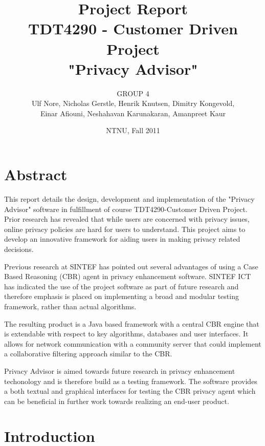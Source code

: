 \documentclass[11pt,a4paper]{book}
\title{Project Report\\
TDT4290 - Customer Driven Project \\ 
"Privacy Advisor"}
\author{GROUP 4\\
Ulf Nore, Nicholas Gerstle, Henrik Knutsen, Dimitry Kongevold,\\ 
Einar Afiouni, Neshahavan Karunakaran, Amanpreet Kaur}
\date{NTNU, Fall 2011}
\begin{document}


\dominitoc 

\frontmatter

\chapter*{\centering Abstract}
This report details the design, development and implementation of the
"Privacy Advisor" software in fulfillment of course TDT4290-Customer
Driven Project. Prior research has revealed that while users are
concerned with privacy issues, online privacy policies are hard for
users to understand. This project aims to develop an
innovative framework for aiding users in making privacy related decisions.

Previous research at SINTEF has pointed
out several advantages of using a Case Based Reasoning (CBR) agent 
in privacy enhancement software. SINTEF ICT
has indicated the use of the project software as part of future
research and therefore emphasis is placed on implementing a broad
and modular testing framework, rather than actual algorithms.

The resulting product is a Java based framework with a central CBR
engine that is extendable with respect to key algorithms, databases
and user interfaces. It allows for network communication with a
community server that could implement a collaborative filtering approach 
similar to the CBR.

Privacy Advisor is aimed towards future research in privacy
enhancement techonology and is therefore build as a testing
framework. The software provides a both textual and graphical
interfaces for testing the CBR privacy agent which can be beneficial
in further work towards realizing an end-user product.





\listoftables

\listoffigures

\tableofcontents \label{toc}



\chapter{Introduction}
\end{document}

